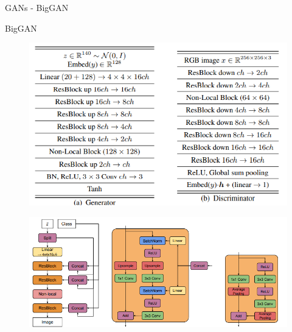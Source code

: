 \documentclass[t]{beamer}
\begin{document}
\begin{frame}[c]{GANs - BigGAN}
  \begin{block}{BigGAN}
\begin{figure}[ht!]
    \centering
    \includegraphics[scale=0.2]{biggan1.png}
\end{figure} 
\begin{figure}[ht!]
    \centering
    \includegraphics[scale=0.25]{biggan2.png}
\end{figure} 
  \end{block}
\end{frame}
\end{document}
